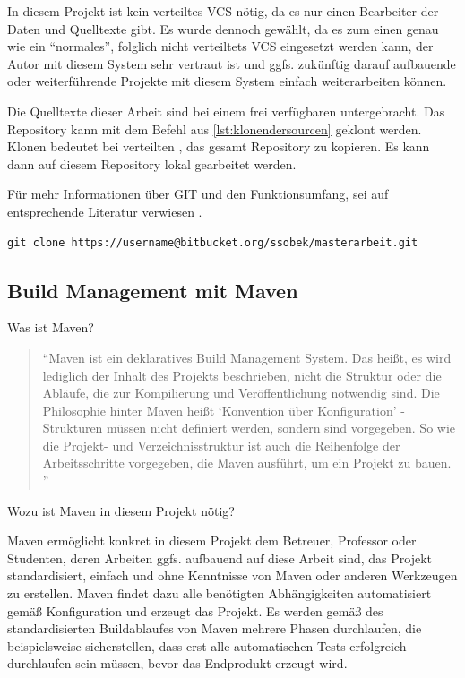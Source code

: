 In diesem Projekt ist kein verteiltes \gls{VCS} nötig, da es nur einen Bearbeiter der Daten und Quelltexte gibt. Es wurde dennoch gewählt, da es zum einen genau wie ein \enquote{normales}, folglich nicht verteiltets \gls{VCS} eingesetzt werden kann, der Autor mit diesem System sehr vertraut ist und ggfs. zukünftig darauf aufbauende oder weiterführende Projekte mit diesem System einfach weiterarbeiten können. 

Die Quelltexte dieser Arbeit sind bei einem frei verfügbaren  untergebracht. Das Repository kann mit dem Befehl aus \autoref{lst:klonendersourcen} geklont werden. Klonen bedeutet bei verteilten , das gesamt Repository zu kopieren. Es kann dann auf diesem Repository lokal gearbeitet werden. 

Für mehr Informationen über GIT und den Funktionsumfang, sei auf entsprechende Literatur verwiesen \citep[vgl.][]{pragGit}.

 \begin{lstlisting}[caption=Klonen der Sourcen, language=XML, label=lst:klonendersourcen]
git clone https://username@bitbucket.org/ssobek/masterarbeit.git
 \end{lstlisting}   

\subsection{Build Management mit Maven}

Was ist Maven?

\begin{quotation}
\enquote{Maven ist ein deklaratives Build Management System. Das heißt, es wird lediglich der Inhalt des Projekts beschrieben, nicht die Struktur oder die Abläufe, die zur Kompilierung und Veröffentlichung notwendig sind. Die Philosophie hinter Maven heißt \enquote{Konvention über Konfiguration} - Strukturen müssen nicht definiert werden, sondern sind vorgegeben. So wie die Projekt- und Verzeichnisstruktur ist auch die Reihenfolge der Arbeitsschritte vorgegeben, die Maven ausführt, um ein Projekt zu bauen. \citep[S. 27][]{Mitp-Verlag}}	
\end{quotation}

Wozu ist Maven in diesem Projekt nötig?

Maven ermöglicht konkret in diesem Projekt dem Betreuer, Professor oder Studenten, deren Arbeiten ggfs. aufbauend auf diese Arbeit sind, das Projekt standardisiert, einfach und ohne Kenntnisse von Maven oder anderen Werkzeugen zu erstellen. Maven findet dazu alle benötigten Abhängigkeiten automatisiert gemäß Konfiguration und erzeugt das Projekt. Es werden gemäß des standardisierten Buildablaufes von Maven mehrere Phasen durchlaufen, die beispielsweise sicherstellen, dass erst alle automatischen Tests erfolgreich durchlaufen sein müssen, bevor das Endprodukt erzeugt wird. 

